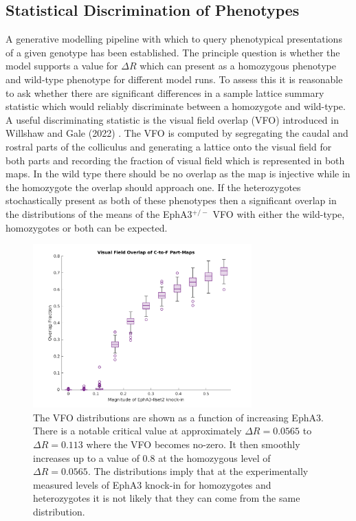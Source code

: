 \subsection{Statistical Discrimination of Phenotypes}
A generative modelling pipeline with which to query phenotypical presentations of a given genotype has been established. The principle question is whether the model supports a value for $\Delta R$ which can present as a homozygous phenotype and wild-type phenotype for different model runs. To assess this it is reasonable to ask whether there are significant differences in a sample lattice summary statistic which would reliably discriminate between a homozygote and wild-type. A useful discriminating statistic is the visual field overlap (VFO) introduced in Willshaw and Gale (2022) \cite{Willshaw2022-fs}. The VFO is computed by segregating the caudal and rostral parts of the colliculus and generating a lattice onto the visual field for both parts and recording the fraction of visual field which is represented in both maps. In the wild type there should be no overlap as the map is injective while in the homozygote the overlap should approach one. If the heterozygotes stochastically present as both of these phenotypes then a significant overlap in the distributions of the means of the EphA3$^{+/-}$ VFO with either the wild-type, homozygotes or both can be expected.
\begin{figure}[h]
	\centering
	\includegraphics[width=0.75\textwidth]{images/lattice/stats_largest_vfo}
	\def\c{The VFO distributions are shown as a function of increasing EphA3. }
	\caption[\c]{\c There is a notable critical value at approximately $\Delta R=0.0565$ to $\Delta R=0.113$ where the VFO becomes no-zero. It then smoothly increases up to a value of 0.8 at the homozygous level of $\Delta R = 0.0565$. The distributions imply that at the experimentally measured levels of EphA3 knock-in for homozygotes and heterozygotes it is not likely that they can come from the same distribution. \label{fig:vfostats}} 
\end{figure}

